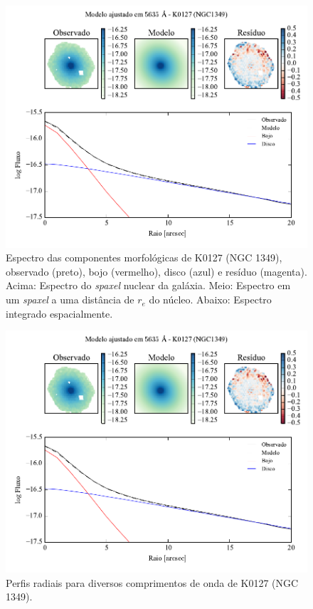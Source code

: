 \begin{figure}
	\includegraphics[page=4]{figuras-decomp/K0127_sample006a}
	\caption[Espectro das componentes morfológicas de K0127 (NGC 1349)]
	{Espectro das componentes morfológicas de K0127 (NGC 1349),
	observado (preto), bojo (vermelho), disco (azul) e resíduo (magenta). Acima:
	Espectro do {\em spaxel} nuclear da galáxia. Meio: Espectro em um {\em spaxel}
	a uma distância de $r_e$ do núcleo. Abaixo: Espectro integrado espacialmente.}
	\label{fig:decompSpectra:K0127}
\end{figure}

\begin{figure}
	\includegraphics[page=5]{figuras-decomp/K0127_sample006a}
	\caption[Perfis radiais para diversos comprimentos de onda de K0127 (NGC 1349)]
	{Perfis radiais para diversos comprimentos de onda de K0127 (NGC 1349).}
	\label{fig:decompRadprofSpec:K0127}
\end{figure}

